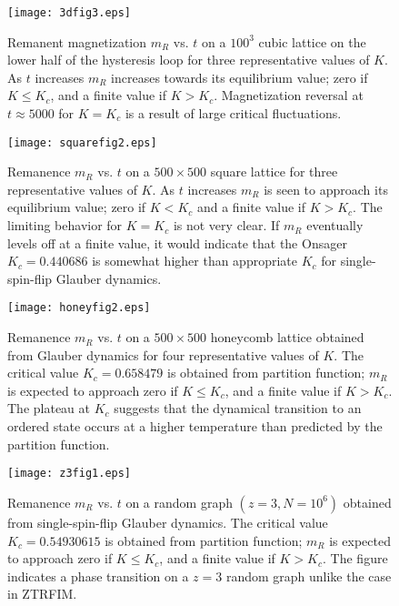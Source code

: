 \documentclass[a4,aps,amsmath,floatfix,nofootinbib,10pt]{revtex4}
\begin{document}
\begin{figure}[ht] 
\texttt{[image: 3dfig3.eps]} \caption 
{Remanent magnetization $m_R$ vs. $t$ on a $100^3$ cubic lattice on 
the lower half of the hysteresis loop for three representative values 
of $K$. As $t$ increases $m_R$ increases towards its equilibrium value; 
zero if $K \le K_c$, and a finite value if $K > K_c$. Magnetization 
reversal at $t \approx 5000$ for $K=K_c$ is a result of large critical 
fluctuations.} \label{fig5} \end{figure}


\begin{figure}[ht] 
\texttt{[image: squarefig2.eps]} \caption 
{Remanence $m_R$ vs. $t$ on a $500 \times 500$ square lattice for three 
representative values of $K$. As $t$ increases $m_R$ is seen to 
approach its equilibrium value; zero if $K < K_c$ and a finite value if 
$K > K_c$. The limiting behavior for $K=K_c$ is not very clear. If 
$m_R$ eventually levels off at a finite value, it would indicate that 
the Onsager $K_c=0.440686$ is somewhat higher than appropriate $K_c$ 
for single-spin-flip Glauber dynamics. } \label{fig6} \end{figure}


\begin{figure}[ht] 
\texttt{[image: honeyfig2.eps]} \caption 
{Remanence $m_R$ vs. $t$ on a $500 \times 500$ honeycomb lattice 
obtained from Glauber dynamics for four representative values of $K$. 
The critical value $K_c=0.658479$ is obtained from partition function; 
$m_R$ is expected to approach zero if $K \le K_c$, and a finite value 
if $K > K_c$. The plateau at $K_c$ suggests that the dynamical 
transition to an ordered state occurs at a higher temperature than 
predicted by the partition function. } \label{fig7} \end{figure}

\begin{figure}[ht] 
\texttt{[image: z3fig1.eps]} \caption 
{Remanence $m_R$ vs. $t$ on a random graph $(z=3, N=10^6)$ obtained 
from single-spin-flip Glauber dynamics. The critical value 
$K_c=0.54930615$ is obtained from partition function; $m_R$ is expected 
to approach zero if $K \le K_c$, and a finite value if $K > K_c$. The 
figure indicates a phase transition on a $z=3$ random graph unlike the 
case in ZTRFIM.} \label{fig8} \end{figure}

\newpage
\end{document}
